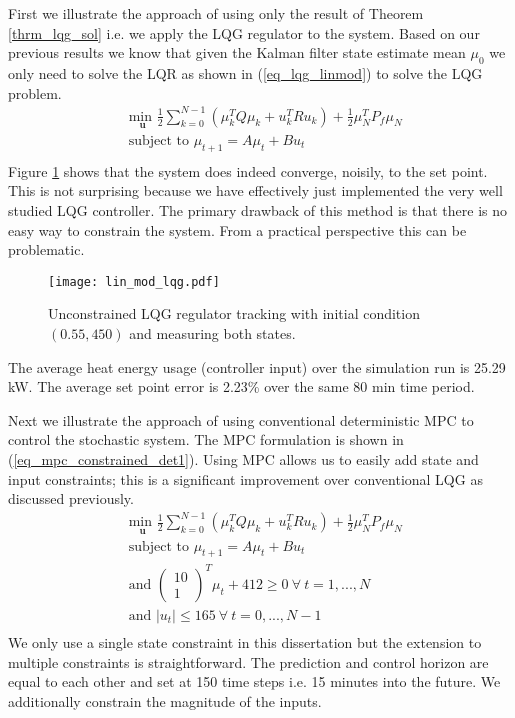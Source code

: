 First we illustrate the approach of using only the result of Theorem \ref{thrm_lqg_sol} i.e. we apply the LQG regulator to the system. Based on our previous results we know that given the Kalman filter state estimate mean $\mu_0$ we only need to solve the LQR as shown in (\ref{eq_lqg_linmod}) to solve the LQG problem. 
\begin{equation}
\begin{aligned}
&\underset{\mathbf{u}}{\text{min }} \frac{1}{2}\sum_{k=0}^{N-1} \left( \mu_k^TQ\mu_k + u_k^TRu_k \right) + \frac{1}{2}\mu_N^TP_f\mu_N \\
& \text{subject to } \mu_{t+1}=A\mu_t + Bu_t \\
\end{aligned}
\label{eq_lqg_linmod}
\end{equation}
Figure \ref{fig_lin_mod_lqg} shows that the system does indeed converge, noisily, to the set point. This is not surprising because we have effectively just implemented the very well studied LQG controller. The primary drawback of this method is that there is no easy way to constrain the system. From a practical perspective this can be problematic. 
\begin{figure}[H] 
\centering
\texttt{[image: lin\_mod\_lqg.pdf]}
\caption{Unconstrained LQG regulator tracking with initial condition $(0.55, 450)$ and measuring both states.}
\label{fig_lin_mod_lqg}
\end{figure}
The average heat energy usage (controller input) over the simulation run is 25.29 kW. The average set point error is 2.23\% over the same 80 min time period.
 
Next we illustrate the approach of using conventional deterministic MPC to control the stochastic system. The MPC formulation is shown in (\ref{eq_mpc_constrained_det1}). Using MPC allows us to easily add state and input constraints; this is a significant improvement over conventional LQG as discussed previously.
\begin{equation}
\begin{aligned}
&\underset{\mathbf{u}}{\text{min }} \frac{1}{2}\sum_{k=0}^{N-1} \left( \mu_k^TQ\mu_k + u_k^TRu_k \right) + \frac{1}{2}\mu_N^TP_f\mu_N \\
& \text{subject to } \mu_{t+1}=A\mu_t + Bu_t \\
&\text{and } \begin{pmatrix}
10 \\ 1
\end{pmatrix}^T \mu_t + 412 \geq 0 ~\forall ~t=1,...,N\\
& \text{and } |u_t| \leq 165 ~\forall ~t=0,...,N-1\\
\end{aligned}
\label{eq_mpc_constrained_det1}
\end{equation}
We only use a single state constraint in this dissertation but the extension to multiple constraints is straightforward. The prediction and control horizon are equal to each other and set at 150 time steps i.e. 15 minutes into the future. We additionally constrain the magnitude of the inputs.


